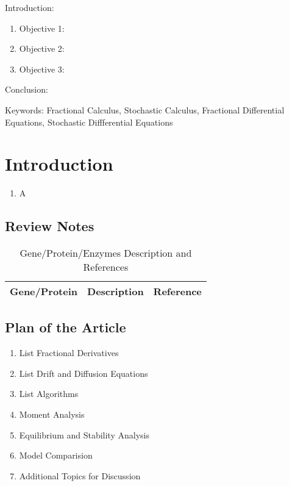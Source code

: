 

\twocolumn
\scriptsize
\begin{frontmatter}
		\title{}
		\author{}
		\address{The Mathematical Learning Space}
\end{frontmatter}	

Introduction:
\begin{enumerate}
\item Objective 1:
\item Objective 2:
\item Objective 3:
\end{enumerate}
Conclusion:

Keywords: Fractional Calculus, Stochastic Calculus, Fractional Differential Equations, Stochastic Diffferential Equations

\section{Introduction}

\begin{enumerate}
	\item A \cite{key1}
\end{enumerate}

\subsection{Review Notes}

\centering	
\begin{table}[H]\tiny
	\caption{Gene/Protein/Enzymes Description and References}	
	\begin{tabular}{r|p{4cm}|l}
		\hline	
		Gene/Protein & Description & Reference \\
		\hline 
		\hline 
	\end{tabular}
\end{table}

\subsection{Plan of the Article}

\begin{enumerate}
\item List Fractional Derivatives
\item List Drift and Diffusion Equations
\item List Algorithms
\item Moment Analysis
\item Equilibrium and Stability Analysis
\item Model Comparision
\item Additional Topics for Discussion
\end{enumerate}

